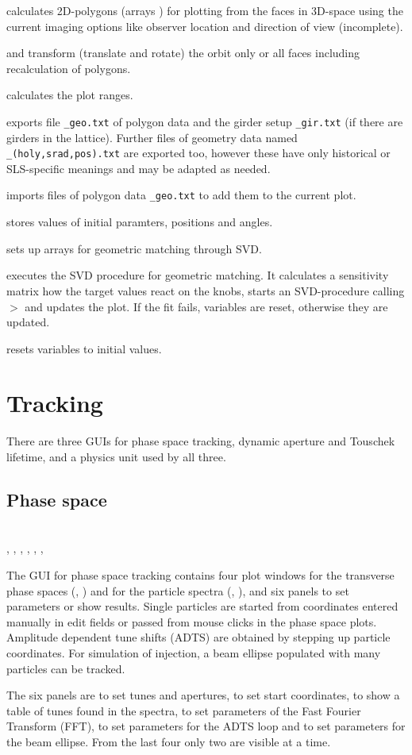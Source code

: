 \documentclass[12pt]{article}
\newcommand\code[1]{{\tt #1}}
\newcommand\guico[1]{{\color{blue}\code{#1}}}
\newcommand{\unico}[1]{{\color{burntorange}\code{#1}}}
\newcommand{\prcod}[2]{\opauni{#1}$>$\unico{#2}}
\newcommand{\opagui}[1]{\colorbox{blue!20}{{\color{black}\code{#1}}}}
\newcommand{\oguih}[2]{\subsection{\label{#2}#1}{\Huge\opagui{#2}}\\}
\newcommand{\ogui}[1]{\hyperref[#1]{\opagui{#1}}}
\newcommand{\opaguif}[1]{\colorbox{violet!30}{{\color{black}\code{#1}}}}
\newcommand{\oguif}[1]{\hyperref[#1]{\opaguif{#1}}}
\newcommand{\opauni}[1]{\colorbox{orange!30}{{\color{black}\code{#1}}}}
\newcommand{\ouni}[1]{\hyperref[#1]{\opauni{#1}}}
\newcommand{\uses}[1]{\flushleft {\bf Uses:} #1}
\newcommand{\desc}[1]{#1}
\newcommand{\todo}[1]{{\color{red} #1}}
\begin{document}
\unico{CalcPoly} calculates 2D-polygons (arrays \unico{ptx,pty}) for plotting from the faces in 3D-space using the current imaging options like observer location and direction of view \todo{(incomplete)}.

\unico{TransRot} and \unico{TransPoly} transform (translate and rotate) the orbit only or all faces including recalculation of polygons.
                 
\unico{geoMinMax}  calculates the plot ranges.

\unico{WriteGeoFiles} exports file \code{*\_geo.txt} of polygon data and the girder setup  \code{*\_gir.txt} (if there are girders in the lattice). \todo{Further files of geometry data named \code{*\_(holy,srad,pos).txt} are exported too, however these have only historical or SLS-specific meanings and may be adapted as needed.}

\unico{ReadGeoFiles} imports files of polygon data \code{*\_geo.txt} to add them to the current plot. 

\unico{gsetedgval} stores values of initial paramters, positions and angles.

\unico{gmat\_ini} sets up arrays for geometric matching through SVD.

\unico{gmat\_step} executes the SVD procedure for geometric matching. It calculates a sensitivity matrix how the target values react on the knobs, starts an SVD-procedure calling \prcod{mathlib}{svdcmp,svbksb} and updates the plot. 
If the fit fails, variables are reset, otherwise they are updated. 

\unico{gmat\_reset} resets variables to initial values.


\section{\label{sectrac}Tracking}
There are three GUIs for phase space tracking, dynamic aperture and Touschek lifetime, and a physics unit used by all three. 

\oguih{Phase space}{opatrackps} 
\uses{\ouni{tracklib}, \ouni{globlib}, \ogui{opatunediag}, \ouni{mathlib}, \oguif{comfigureframe}, \ouni{comvgraphlib}, \ouni{comauxlib}}

\desc{
The GUI for phase space tracking contains four plot windows for the transverse phase spaces (\guico{psx}, \guico{psy}) and for the particle spectra (\guico{ftx}, \guico{fty}), and six panels to set parameters or show results. Single particles are started from coordinates entered manually in edit fields or passed from mouse clicks in the phase space plots.  Amplitude dependent tune shifts (ADTS) are obtained by stepping up particle coordinates. For simulation of injection, a beam ellipse populated with many particles can be tracked. 

The six panels are \guico{PanParam} to set tunes and apertures, \guico{PanCtrl} to set start coordinates, \guico{PanRes} to show a table of tunes found in the spectra, \guico{PanFFT} to set parameters of the Fast Fourier Transform (FFT), \guico{PanTush} to set parameters for the ADTS loop and \guico{PanBeam} to set parameters for the beam ellipse. From the last four only two are visible at a time.}
\end{document}
